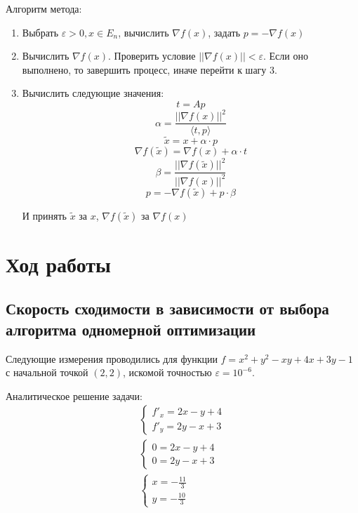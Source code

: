 Алгоритм метода:
\begin{enumerate}
	\item Выбрать \(\varepsilon > 0, x \in E_n\), вычислить \(\nabla f(x)\), задать \(p = -\nabla f(x)\)
	\item Вычислить \(\nabla f(x)\). Проверить условие \(||\nabla f(x)|| < \varepsilon\). Если оно выполнено, то завершить процесс, иначе перейти к шагу 3.
	\item Вычислить следующие значения:
	      \[t = Ap\]
	      \[\alpha = \frac{||\nabla f(x)||^2}{\langle t, p\rangle} \]
	      \[\tilde{x} = x + \alpha \cdot p\]
	      \[\nabla f(\tilde{x}) = \nabla f(x) + \alpha \cdot t\]
	      \[\beta = \frac{||\nabla f(\tilde{x})||^2}{||\nabla f(x)||^2}\]
	      \[p = - \nabla f(\tilde{x}) + p \cdot \beta\]

	      И принять \(\tilde{x}\) за \(x\), \(\nabla f(\tilde{x})\) за \(\nabla f(x)\)
\end{enumerate}

\section{Ход работы}

\subsection{Скорость сходимости в зависимости от выбора алгоритма одномерной оптимизации}

Следующие измерения проводились для функции \(f = x^2 + y^2 - xy + 4x + 3y - 1\) с начальной точкой \((2, 2)\), искомой точностью \(\varepsilon = 10^{ - 6}\).

Аналитическое решение задачи:
\begin{align*}
	 & \begin{cases}
		f'_x = 2x - y + 4 \\
		f'_y = 2y - x + 3
	\end{cases}  & \\
	 & \begin{cases}
		0 = 2x - y + 4 \\
		0 = 2y - x + 3
	\end{cases}   \\
	 & \begin{cases} x = - \frac{11}{3} \\ y = - \frac{10}{3} \end{cases}
\end{align*}


